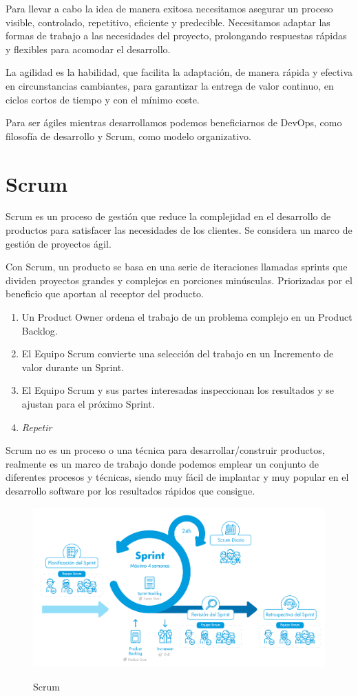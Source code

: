 \documentclass[12pt,twoside,titlepage]{report}
\begin{document}
Para llevar a cabo la idea de manera exitosa necesitamos asegurar un proceso visible, controlado, repetitivo, eficiente y predecible. Necesitamos adaptar las formas de trabajo a las necesidades del proyecto, prolongando respuestas rápidas y flexibles para acomodar el desarrollo.

La agilidad es la habilidad, que facilita la adaptación, de manera rápida y efectiva en circunstancias cambiantes, para garantizar la entrega de valor continuo, en ciclos cortos de tiempo y con el mínimo coste.

Para ser ágiles mientras desarrollamos podemos beneficiarnos de DevOps, como filosofía de desarrollo y Scrum, como modelo organizativo.

\section{Scrum}

Scrum es un proceso de gestión que reduce la complejidad en el desarrollo de productos para satisfacer las necesidades de los clientes. Se considera un marco de gestión de proyectos ágil.

Con Scrum, un producto se basa en una serie de iteraciones llamadas sprints que dividen proyectos grandes y complejos en porciones minúsculas. Priorizadas por el beneficio que aportan al receptor del producto.

\begin{enumerate}
    \item Un Product Owner ordena el trabajo de un problema complejo en un Product Backlog.
    \item El Equipo Scrum convierte una selección del trabajo en un Incremento de valor durante un Sprint.
    \item El Equipo Scrum y sus partes interesadas inspeccionan los resultados y se ajustan para el próximo Sprint.
    \item \textit{Repetir}
\end{enumerate}

Scrum no es un proceso o una técnica para desarrollar/construir productos, realmente es un marco de trabajo donde podemos emplear un conjunto de diferentes procesos y técnicas, siendo muy fácil de implantar y muy popular en el desarrollo software por los resultados rápidos que consigue.

\begin{figure}[H]
    \centering
    \includegraphics[scale=0.39]{Scrum/Scrum}
    \label{fig:Scrum}
    \caption{Scrum}
\end{figure}
\end{document}
